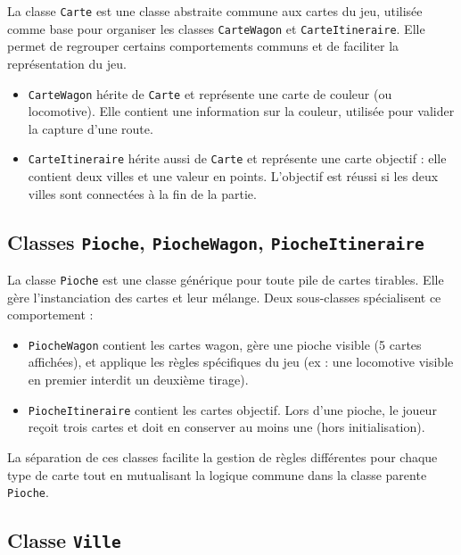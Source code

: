 \documentclass[a4paper,12pt]{report}
\begin{document}
La classe \texttt{Carte} est une classe abstraite commune aux cartes du jeu, utilisée comme base pour organiser les
classes \texttt{CarteWagon} et \texttt{CarteItineraire}. Elle permet de regrouper certains comportements communs et de
faciliter la représentation du jeu.

\begin{itemize}
    \item \texttt{CarteWagon} hérite de \texttt{Carte} et représente une carte de couleur (ou locomotive).
    Elle contient une information sur la couleur, utilisée pour valider la capture d'une route.
    \item \texttt{CarteItineraire} hérite aussi de \texttt{Carte} et représente une carte objectif :
    elle contient deux villes et une valeur en points. L’objectif est réussi si les deux villes sont
    connectées à la fin de la partie.
\end{itemize}

\vspace{0.5em}

\subsection*{Classes \texttt{Pioche}, \texttt{PiocheWagon}, \texttt{PiocheItineraire}}

La classe \texttt{Pioche} est une classe générique pour toute pile de cartes tirables.
Elle gère l'instanciation des cartes et leur mélange.
Deux sous-classes spécialisent ce comportement :

\begin{itemize}
    \item \texttt{PiocheWagon} contient les cartes wagon, gère une pioche visible (5 cartes affichées),
    et applique les règles spécifiques du jeu (ex : une locomotive visible en premier interdit un deuxième tirage).
    \item \texttt{PiocheItineraire} contient les cartes objectif.
    Lors d’une pioche, le joueur reçoit trois cartes et doit en conserver au moins une (hors initialisation).
\end{itemize}

La séparation de ces classes facilite la gestion de règles différentes pour chaque type de carte tout en mutualisant
la logique commune dans la classe parente \texttt{Pioche}.

\subsection*{Classe \texttt{Ville}}
\end{document}
